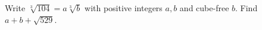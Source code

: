 Write $\sqrt[3]{104}=a\sqrt[3]{b}$ with positive integers $a,b$ and cube-free $b$. Find $a+b+\sqrt{529}$.
